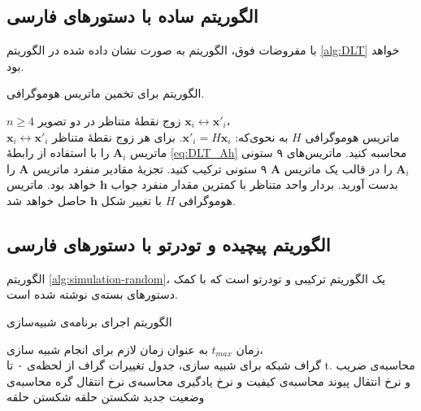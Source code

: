 \subsection{الگوریتم ساده با دستورهای فارسی}
با مفروضات فوق، الگوریتم  به صورت نشان داده شده در الگوریتم \eqref{alg:DLT}  خواهد بود.
\begin{algorithm}[ht]
\onehalfspacing
\caption{الگوریتم  برای تخمین ماتریس هوموگرافی.} \label{alg:DLT}
\begin{algorithmic}[1]
\REQUIRE $n\geq4$ زوج نقطهٔ متناظر در دو تصویر 
${\mathbf{x}_i\leftrightarrow\mathbf{x}'_i}$،\\
\ENSURE ماتریس هوموگرافی $H$ به نحوی‌که: 
$\mathbf{x}'_i = H \mathbf{x}_i$.
  \STATE برای هر زوج نقطهٔ متناظر
$\mathbf{x}_i\leftrightarrow\mathbf{x}'_i$ 
ماتریس $\mathbf{A}_i$ را با استفاده از رابطهٔ \ref{eq:DLT_Ah} محاسبه کنید.
  \STATE ماتریس‌های ۹ ستونی  $\mathbf{A}_i$ را در قالب یک ماتریس $\mathbf{A}$ ۹ ستونی ترکیب کنید. 
  \STATE تجزیهٔ مقادیر منفرد   ماتریس $\mathbf{A}$ را بدست آورید. بردار واحد متناظر با کمترین مقدار منفرد جواب $\mathbf{h}$ خواهد بود.
  \STATE  ماتریس هوموگرافی $H$ با تغییر شکل $\mathbf{h}$ حاصل خواهد شد.
\end{algorithmic}
\end{algorithm}

\subsection{الگوریتم پیچیده و تودرتو با دستورهای فارسی}
الگوریتم \ref{alg:simulation-random}، یک الگوریتم ترکیبی و تودرتو است که با کمک دستورهای بسته‌ی  نوشته شده است.

\begin{algorithm}[p]
    \onehalfspacing
    \caption{الگوریتم اجرای برنامه‌ی شبیه‌سازی}
    \label{alg:simulation-random}
    \begin{algorithmic}[1]
        \REQUIRE زمان $t_{max}$ به عنوان زمان لازم برای انجام شبیه سازی،\\
        \REQUIRE  گراف شبکه برای شبیه سازی،
        \ENSURE جدول تغییرات گراف از لحظه‌ی ۰ تا t.
                \STATE محاسبه‌ی ضریب و نرخ انتقال پیوند
                \STATE محاسبه‌ی کیفیت و نرخ یادگیری
            \ENDFOR
                \STATE محاسبه‌ی نرخ انتقال گره
                \STATE محاسبه‌ی وضعیت جدید
            \ENDFOR
                \STATE شکستن حلقه
                \STATE شکستن حلقه
            \ENDIF
        \ENDFOR
    \end{algorithmic}
\end{algorithm}

